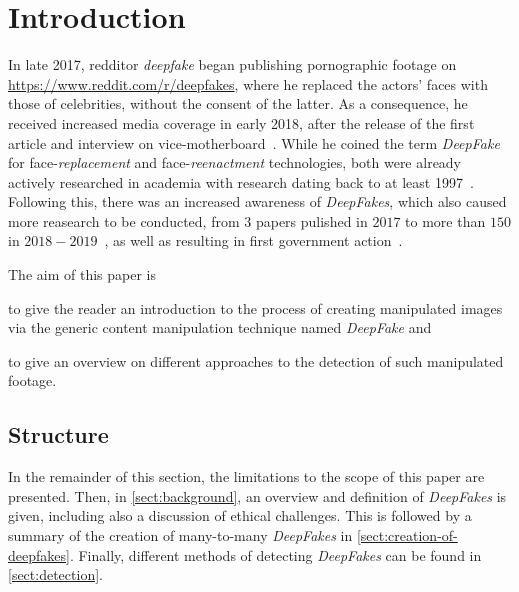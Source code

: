 \section{Introduction}
In late 2017, \gls{redditor} \textit{deepfake} began publishing pornographic footage
on \url{https://www.reddit.com/r/deepfakes}, where he replaced the actors' faces
with those of celebrities, without the consent of the latter. As a consequence, he
received increased media coverage in early 2018, after the release of the first 
article and interview on vice-motherboard~\cite{Cole.2017}. While he coined the
term \textit{DeepFake} for face-\textit{replacement} and face-\textit{reenactment}
technologies, both were already actively researched in academia with research 
dating back to at least 1997~\cite{Bregler.1997}.
Following this, there was an increased awareness of \textit{DeepFakes}, which also
caused more reasearch to be conducted, from \(3\) papers pulished in \(2017\) to
more than \(150\) in \(2018-2019\)~\cite{mirsky_creation_2020}, as well as
resulting in first government action~\cite{senate_-_homeland_security_and_governmental_affairs_deepfake_2019}.

\par
The aim of this paper is
\begin{enumerate*}[a.)]
    \item to give the reader an introduction to the process of creating manipulated
    images via the generic content manipulation technique named \textit{DeepFake}
    and
    \item to give an overview on different approaches to the detection of such manipulated footage.
\end{enumerate*}

\subsection{Structure}
In the remainder of this section, the limitations to the scope of this paper are
presented. Then, in \cref{sect:background}, an overview and definition of \textit{DeepFakes}
is given, including also a discussion of ethical challenges.
This is followed by a summary of the creation of many-to-many \textit{DeepFakes}
in \cref{sect:creation-of-deepfakes}. Finally, different methods of detecting
\textit{DeepFakes} can be found in \cref{sect:detection}.

